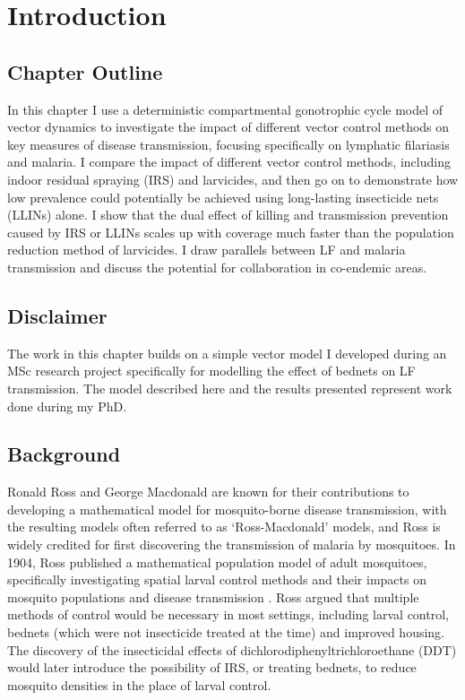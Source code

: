 \section{Introduction}

\subsection{Chapter Outline}

In this chapter I use a deterministic compartmental gonotrophic cycle model of vector dynamics to investigate the impact of different vector control methods on key measures of disease transmission, focusing specifically on lymphatic filariasis and malaria. I compare the impact of different vector control methods, including indoor residual spraying (IRS) and larvicides, and then go on to demonstrate how low prevalence could potentially be achieved using long-lasting insecticide nets (LLINs) alone. I show that the dual effect of killing and transmission prevention caused by IRS or LLINs scales up with coverage much faster than the population reduction method of larvicides. I draw parallels between LF and malaria transmission and discuss the potential for collaboration in co-endemic areas.

\subsection{Disclaimer}

The work in this chapter builds on a simple vector model I developed during an MSc research project specifically for modelling the effect of bednets on LF transmission. The model described here and the results presented represent work done during my PhD.

\subsection{Background}

Ronald Ross and George Macdonald are known for their contributions to developing a mathematical model for mosquito-borne disease transmission, with the resulting models often referred to as `Ross-Macdonald' models, and Ross is widely credited for first discovering the transmission of malaria by mosquitoes. In 1904, Ross published a mathematical population model of adult mosquitoes, specifically investigating spatial larval control methods and their impacts on mosquito populations and disease transmission \cite{Ross1905}. Ross argued that multiple methods of control would be necessary in most settings, including larval control, bednets (which were not insecticide treated at the time) and improved housing. The discovery of the insecticidal effects of dichlorodiphenyltrichloroethane (DDT) would later introduce the possibility of IRS, or treating bednets, to reduce mosquito densities in the place of larval control. 

